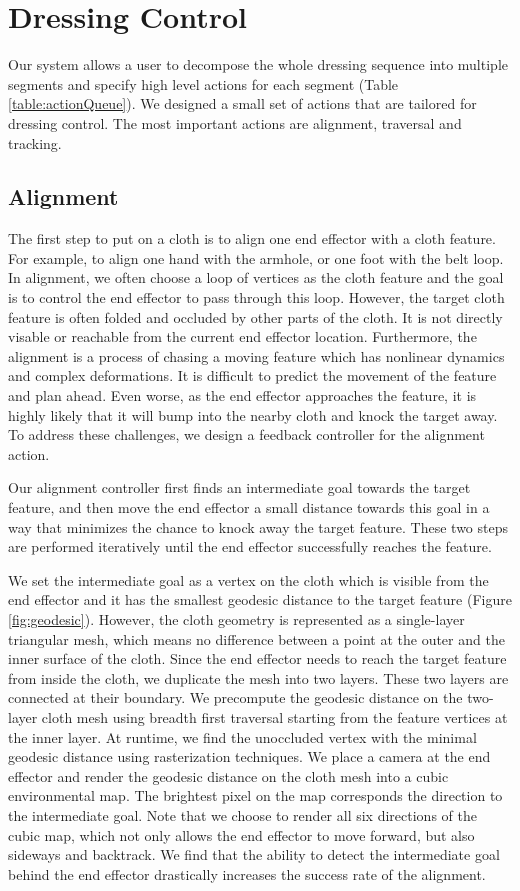 \section{Dressing Control}

Our system allows a user to decompose the whole dressing sequence into multiple segments and specify high level actions for each segment (Table \ref{table:actionQueue}). We designed a small set of actions that are tailored for dressing control. The most important actions are alignment, traversal and tracking. 

\subsection{Alignment}
The first step to put on a cloth is to align one end effector with a cloth feature. For example, to align one hand with the armhole, or one foot with the belt loop. In alignment, we often choose a loop of vertices as the cloth feature and the goal is to control the end effector to pass through this loop. However, the target cloth feature is often folded and occluded by other parts of the cloth. It is not directly visable or reachable from the current end effector location. Furthermore, the alignment is a process of chasing a moving feature which has nonlinear dynamics and complex deformations. It is difficult to predict the movement of the feature and plan ahead. Even worse, as the end effector approaches the feature, it is highly likely that it will bump into the nearby cloth and knock the target away.  To address these challenges, we design a feedback controller for the alignment action.

Our alignment controller first finds an intermediate goal towards the target feature, and then move the end effector a small distance towards this goal in a way that minimizes the chance to knock away the target feature. These two steps are performed iteratively until the end effector successfully reaches the feature.

We set the intermediate goal as a vertex on the cloth which is visible from the end effector and it has the smallest geodesic distance to the target feature (Figure \ref{fig:geodesic}). However, the cloth geometry is represented as a single-layer triangular mesh, which means no difference between a point at the outer and the inner surface of the cloth. Since the end effector needs to reach the target feature from inside the cloth, we duplicate the mesh into two layers. These two layers are connected at their boundary. We precompute the geodesic distance on the two-layer cloth mesh using breadth first traversal starting from the feature vertices at the inner layer. At runtime, we find the unoccluded vertex with the minimal geodesic distance using rasterization techniques. We place a camera at the end effector and render the geodesic distance on the cloth mesh into a cubic environmental map. The brightest pixel on the map corresponds the direction to the intermediate goal. Note that we choose to render all six directions of the cubic map, which not only allows the end effector to move forward, but also sideways and backtrack. We find that the ability to detect the intermediate goal behind the end effector drastically increases the success rate of the alignment.

